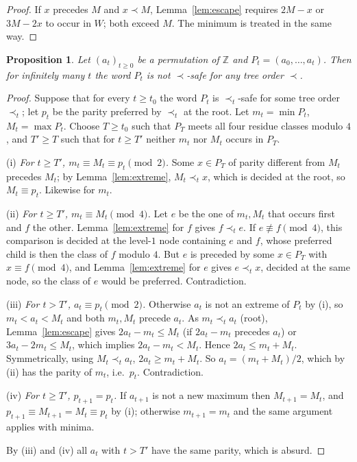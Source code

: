\documentclass[11pt]{amsart}
\newtheorem{proposition}[theorem]{Proposition}
\theoremstyle{definition}
\theoremstyle{remark}
\newcommand{\Z}{\mathbb{Z}}
\begin{document}
\begin{proof}
If $x$ precedes $M$ and $x\prec M$, Lemma~\ref{lem:escape} requires $2M-x$ or $3M-2x$ to occur in $W$; both exceed $M$. The minimum is treated in the same way.
\end{proof}

\begin{proposition}\label{prop:allprefix}
Let $(a_t)_{t\ge0}$ be a permutation of $\Z$ and $P_t=(a_0,\dots,a_t)$. Then for infinitely many $t$ the word $P_t$ is not $\prec$-safe for any tree order $\prec$.
\end{proposition}

\begin{proof}
Suppose that for every $t\ge t_0$ the word $P_t$ is $\prec_t$-safe for some tree order $\prec_t$; let $p_t$ be the parity preferred by $\prec_t$ at the root. Let $m_t=\min P_t$, $M_t=\max P_t$. Choose $T\ge t_0$ such that $P_T$ meets all four residue classes modulo $4$, and $T'\ge T$ such that for $t\ge T'$ neither $m_t$ nor $M_t$ occurs in $P_T$.

(i) \emph{For $t\ge T'$, $m_t\equiv M_t\equiv p_t\pmod 2$.} Some $x\in P_T$ of parity different from $M_t$ precedes $M_t$; by Lemma~\ref{lem:extreme}, $M_t\prec_t x$, which is decided at the root, so $M_t\equiv p_t$. Likewise for $m_t$.

(ii) \emph{For $t\ge T'$, $m_t\equiv M_t\pmod 4$.} Let $e$ be the one of $m_t,M_t$ that occurs first and $f$ the other. Lemma~\ref{lem:extreme} for $f$ gives $f\prec_t e$. If $e\not\equiv f\pmod 4$, this comparison is decided at the level-$1$ node containing $e$ and $f$, whose preferred child is then the class of $f$ modulo $4$. But $e$ is preceded by some $x\in P_T$ with $x\equiv f\pmod 4$, and Lemma~\ref{lem:extreme} for $e$ gives $e\prec_t x$, decided at the same node, so the class of $e$ would be preferred. Contradiction.

(iii) \emph{For $t>T'$, $a_t\equiv p_t\pmod 2$.} Otherwise $a_t$ is not an extreme of $P_t$ by (i), so $m_t<a_t<M_t$ and both $m_t,M_t$ precede $a_t$. As $m_t\prec_t a_t$ (root), Lemma~\ref{lem:escape} gives $2a_t-m_t\le M_t$ (if $2a_t-m_t$ precedes $a_t$) or $3a_t-2m_t\le M_t$, which implies $2a_t-m_t<M_t$. Hence $2a_t\le m_t+M_t$. Symmetrically, using $M_t\prec_t a_t$, $2a_t\ge m_t+M_t$. So $a_t=(m_t+M_t)/2$, which by (ii) has the parity of $m_t$, i.e.\ $p_t$. Contradiction.

(iv) \emph{For $t\ge T'$, $p_{t+1}=p_t$.} If $a_{t+1}$ is not a new maximum then $M_{t+1}=M_t$, and $p_{t+1}\equiv M_{t+1}=M_t\equiv p_t$ by (i); otherwise $m_{t+1}=m_t$ and the same argument applies with minima.

By (iii) and (iv) all $a_t$ with $t>T'$ have the same parity, which is absurd.
\end{proof}
\end{document}
